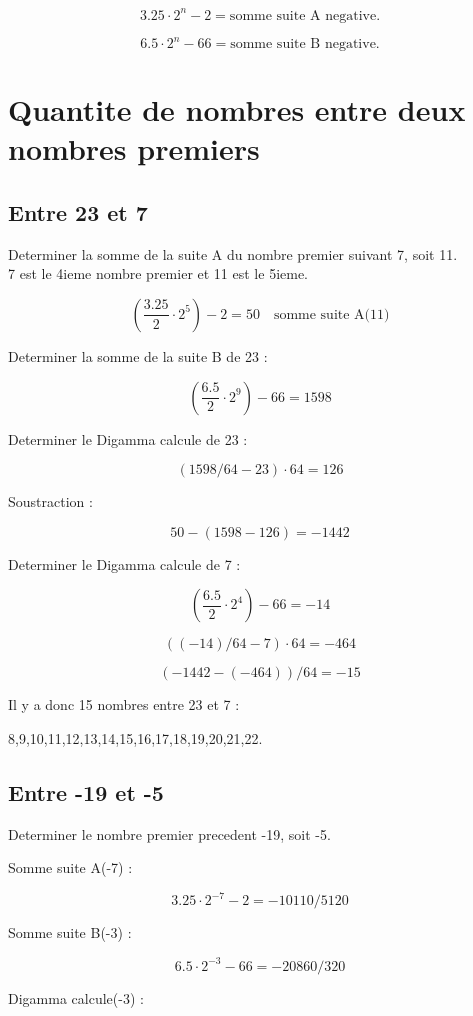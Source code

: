 \documentclass[a4paper,11pt]{article}
\begin{document}
\[
3.25 \cdot 2^{n} - 2 = \text{somme suite A negative.}
\]

\[
6.5 \cdot 2^{n} - 66 = \text{somme suite B negative.}
\]

\section*{Quantite de nombres entre deux nombres premiers}

\subsection*{Entre 23 et 7}

Determiner la somme de la suite A du nombre premier suivant 7, soit 11.\\
7 est le 4ieme nombre premier et 11 est le 5ieme.

\[
\left(\frac{3.25}{2} \cdot 2^{5}\right) - 2 = 50 \quad \text{somme suite A(11)}
\]

Determiner la somme de la suite B de 23 :

\[
\left(\frac{6.5}{2} \cdot 2^{9}\right) - 66 = 1598
\]

Determiner le Digamma calcule de 23 :

\[
(1598/64 - 23) \cdot 64 = 126
\]

Soustraction :

\[
50 - (1598 - 126) = -1442
\]

Determiner le Digamma calcule de 7 :

\[
\left(\frac{6.5}{2} \cdot 2^{4}\right) - 66 = -14
\]

\[
((-14)/64 - 7) \cdot 64 = -464
\]

\[
(-1442 - (-464))/64 = -15
\]

Il y a donc 15 nombres entre 23 et 7 :

8,9,10,11,12,13,14,15,16,17,18,19,20,21,22.

\subsection*{Entre -19 et -5}

Determiner le nombre premier precedent -19, soit -5.

Somme suite A(-7) :

\[
3.25 \cdot 2^{-7} - 2 = -10110/5120
\]

Somme suite B(-3) :

\[
6.5 \cdot 2^{-3} - 66 = -20860/320
\]

Digamma calcule(-3) :
\end{document}
